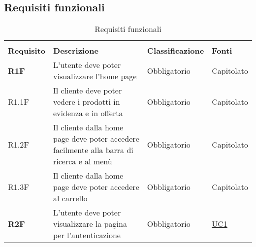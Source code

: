 \subsection{Requisiti funzionali}
\begin{center}
    \centering
    \renewcommand{\arraystretch}{1.8}
    \label{tab:RequisitiFunzionali}
    \begin{longtable}[!h]{p{50px} p{245px} p{75px} p{50px}}
        \rowcolor{white}\caption{Requisiti funzionali}                                                                                                                                                                                                                             \\
        \rowcolor{logo!70} \textbf{Requisito} & \textbf{Descrizione}                                                                                                                                   & \textbf{Classificazione} & \textbf{Fonti}                                 \\
        \textbf{R1F}                          & L'utente deve poter visualizzare l'home page                                                                                                           & Obbligatorio             & Capitolato                                     \\
        R1.1F                                 & Il cliente deve poter vedere i prodotti in evidenza e in offerta                                                                                       & Obbligatorio             & Capitolato                                     \\
        R1.2F                                 & Il cliente dalla home page deve poter accedere facilmente alla barra di ricerca e al menù                                                              & Obbligatorio             & Capitolato                                     \\
        R1.3F                                 & Il cliente dalla home page deve poter accedere al carrello                                                                                             & Obbligatorio             & Capitolato                                     \\
        \textbf{R2F}                          & L'utente deve poter visualizzare la pagina per l'autenticazione                                                                                        & Obbligatorio             & \hyperref[sec:UC1]{UC1}                        \\

\end{longtable}
\end{center}
